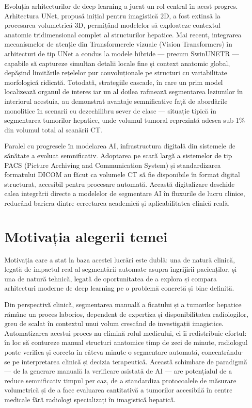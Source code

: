 \documentclass[12pt, a4paper]{report}
\begin{document}
Evoluția arhitecturilor de deep learning a jucat un rol central în
acest progres. Arhitectura UNet, propusă inițial pentru imagistică
2D, a fost extinsă la procesarea volumetrică 3D, permițând modelelor
să exploateze contextul anatomic tridimensional complet al structurilor
hepatice. Mai recent, integrarea mecanismelor de atenție din
Transformerele vizuale (Vision Transformers) în arhitecturi de tip
UNet a condus la modele hibride — precum SwinUNETR — capabile să
captureze simultan detalii locale fine și context anatomic global,
depășind limitările rețelelor pur convoluționale pe structuri cu
variabilitate morfologică ridicată. Totodată, strategiile cascade,
în care un prim model localizează organul de interes iar un al
doilea rafinează segmentarea leziunilor în interiorul acestuia,
au demonstrat avantaje semnificative față de abordările monolitice
în scenarii cu dezechilibru sever de clase — situație tipică în
segmentarea tumorilor hepatice, unde volumul tumoral reprezintă
adesea sub 1\% din volumul total al scanării CT.

Paralel cu progresele în modelarea AI, infrastructura digitală din
sistemele de sănătate a evoluat semnificativ. Adoptarea pe scară
largă a sistemelor de tip PACS (Picture Archiving and Communication
System) și standardizarea formatului DICOM au făcut ca volumele CT
să fie disponibile în format digital structurat, accesibil pentru
procesare automată. Această digitalizare deschide calea integrării
directe a modelelor de segmentare AI în fluxurile de lucru clinice,
reducând bariera dintre cercetarea academică și aplicabilitatea
clinică reală.

\section{Motivația alegerii temei}

Motivația care a stat la baza acestei lucrări este dublă: una de
natură clinică, legată de impactul real al segmentării automate
asupra îngrijirii pacienților, și una de natură tehnică, legată de
oportunitatea de a explora și compara arhitecturi moderne de deep
learning pe o problemă concretă și bine definită.

Din perspectivă clinică, segmentarea manuală a ficatului și a
tumorilor hepatice rămâne un proces laborios, dependent de
expertiza și disponibilitatea radiologilor, greu de scalat în
contextul unui volum crescând de investigații imagistice. Automatizarea
acestui proces nu elimină rolul medicului, ci îi redistribuie
efortul: în loc să contureze manual structuri anatomice timp de
zeci de minute, radiologul poate verifica și corecta în câteva
minute o segmentare automată, concentrându-se pe interpretarea
clinică și decizia terapeutică. Această schimbare de paradigmă —
de la generare manuală la verificare asistată de AI — are potențialul
de a reduce semnificativ timpul per caz, de a standardiza
protocoalele de măsurare volumetrică și de a face evaluarea
cantitativă a tumorilor accesibilă în centre medicale fără
radiologi specializați în imagistică hepatică.
\end{document}
